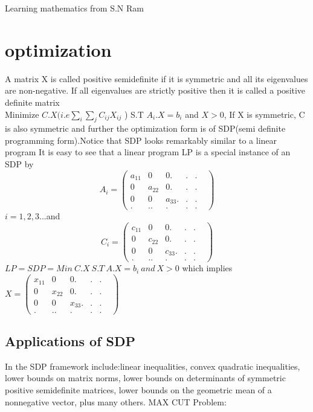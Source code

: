 \documentclass[12pt]{article}
\begin{document}

\begin{center}
    \large  Learning mathematics from S.N Ram
\end{center}
\section{optimization}
A matrix X is called positive semidefinite if it is symmetric and all its eigenvalues are non-negative. If all eigenvalues are strictly positive then it is called a positive definite matrix\\

Minimize $C.X( i.e\sum_{i}\sum_{j}C_{ij}X_{ij}$ )    S.T $A_{i}.X=b_{i}$ and $X>0$, If X is symmetric, C is also symmetric and further the optimization form is of SDP(semi definite programming form).Notice that SDP looks remarkably similar to a linear program
It is easy to see that a linear program LP is a special instance of an SDP by
\[A_{i}=\begin{pmatrix} 
a_{11} & 0 & 0.&.&.& \\0 &  a_{22}&  0.&.&.&\\0 & 0 & a_{33}.&.&.&\\. &..&. &. &.\end{pmatrix}
\]$i=1,2,3... $and \[C_{i}=\begin{pmatrix} c_{11} & 0 & 0.&.&.& \\0 &  c_{22}&  0.&.&.&\\0 & 0 & c_{33}.&.&.&\\. &..&. &. &.\end{pmatrix}\]
$LP=SDP=Min \ C.X \  S.T \ A.X=b_{i}\ and\ X>0$ which implies $X =\begin{pmatrix} x_{11} & 0 & 0.&.&.& \\0 &  x_{22}&  0.&.&.&\\0 & 0 & x_{33}.&.&.&\\. &..&. &. &.\end{pmatrix}$
\subsection{Applications of  SDP}
 In the SDP framework include:linear inequalities, convex quadratic inequalities, lower bounds on matrix norms, lower bounds on determinants of symmetric positive semidefinite
matrices, lower bounds on the geometric mean of a nonnegative vector, plus
many others.
MAX CUT Problem:\\
\end{document}
